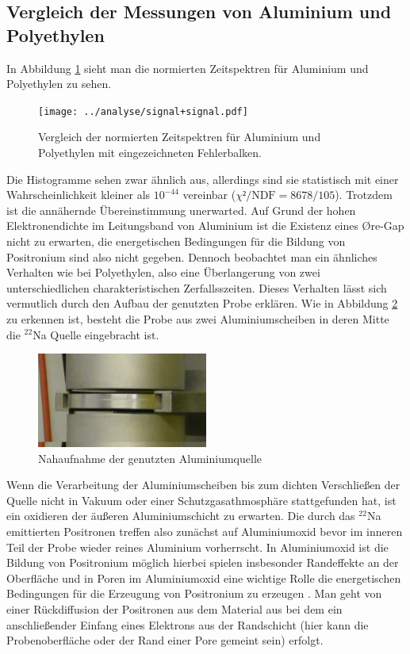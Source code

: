 \documentclass[a4paper,12pt]{article}
\begin{document}
\subsection{Vergleich der Messungen von Aluminium und Polyethylen}
In Abbildung \ref{fig:compare_signal} sieht man die normierten Zeitspektren für Aluminium und
Polyethylen zu sehen.
\begin{figure}[h]
	\texttt{[image: ../analyse/signal+signal.pdf]}
	\caption{Vergleich der normierten Zeitspektren für Aluminium und Polyethylen mit eingezeichneten Fehlerbalken.}
	\label{fig:compare_signal}
\end{figure}

Die Histogramme sehen zwar ähnlich aus, allerdings sind sie statistisch mit einer Wahrscheinlichkeit
kleiner als $10^{-44}$ vereinbar ($χ²/\text{NDF} = 8678/105$).
Trotzdem ist die annähernde Übereinstimmung unerwarted. Auf Grund der hohen Elektronendichte im Leitungsband von Aluminium ist die Existenz eines Øre-Gap nicht zu erwarten, die 
energetischen Bedingungen für die Bildung von Positronium sind also nicht gegeben. Dennoch beobachtet man ein ähnliches Verhalten wie bei 
Polyethylen, also eine Überlangerung von zwei unterschiedlichen charakteristischen Zerfallsszeiten. Dieses Verhalten lässt sich vermutlich durch
den Aufbau der genutzten Probe erklären.
Wie in Abbildung \ref{fig:quelle_nah} zu erkennen ist,
besteht die Probe aus zwei Aluminiumscheiben in deren Mitte die $^{22}$Na Quelle eingebracht ist.
\begin{figure}
	\centering
	\includegraphics[width=0.5\textwidth]{../pictures/quelle_nah.jpg}
	\caption{Nahaufnahme der genutzten Aluminiumquelle }
	\label{fig:quelle_nah}
\end{figure}


Wenn die Verarbeitung der Aluminiumscheiben bis zum dichten Verschließen der Quelle nicht
in Vakuum oder einer Schutzgasathmosphäre stattgefunden hat, ist ein oxidieren der äußeren Aluminiumschicht zu erwarten. Die durch das $^{22}$Na
emittierten Positronen treffen also zunächst auf Aluminiumoxid bevor im inneren Teil der Probe wieder reines Aluminium vorherrscht. In Aluminiumoxid
ist die Bildung von Positronium möglich \cite{PhysRevB.70.115410} hierbei spielen insbesonder Randeffekte an der Oberfläche und in Poren im
Aluminiumoxid eine wichtige Rolle die energetischen Bedingungen für die Erzeugung von Positronium zu erzeugen \cite{phd_trezzi}. Man geht von
einer Rückdiffusion der Positronen aus dem Material aus bei dem ein anschließender Einfang eines Elektrons aus der Randschicht 
(hier kann die Probenoberfläche oder der Rand einer Pore gemeint sein) erfolgt.
\end{document}
